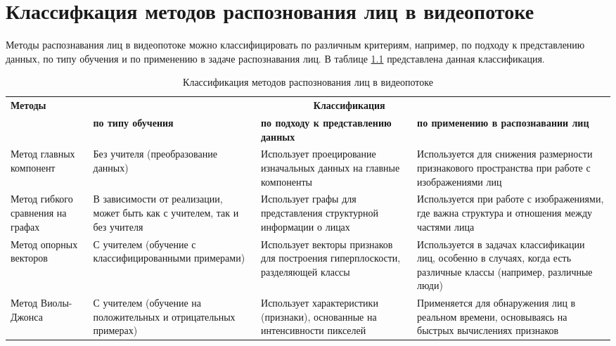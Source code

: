\chapter{Классифкация методов распознования лиц в видеопотоке}

Методы распознавания лиц в видеопотоке можно классифицировать по различным критериям, например, по подходу к представлению данных, по типу обучения и по применению в задаче распознавания лиц. В таблице \ref{tab:table} представлена данная классификация.

\begin{table}[h]
    \centering
    \small
    \caption{\label{tab:table} Классификация методов распознования лиц в видеопотоке}
    \begin{tabular}{|p{2cm}|p{3cm}|p{5cm}|p{5cm}|}
        \hline
        \multicolumn{1}{|l|}{\textbf{Методы}} & \multicolumn{3}{c|}{\textbf{Классификация}} \\
        \cline{2-4}
        & \textbf{по типу обучения} & \textbf{по подходу к представлению данных} & \textbf{по применению в распознавании лиц} \\
        \hline
        Метод главных компонент & Без учителя (преобразование данных) & Использует проецирование изначальных данных на главные компоненты & Используется для снижения размерности признакового пространства при работе с изображениями лиц \\
        \hline
        Метод гибкого сравнения на графах & В зависимости от реализации, может быть как с учителем, так и без учителя & Использует графы для представления структурной информации о лицах & Используется при работе с изображениями, где важна структура и отношения между частями лица \\
        \hline
        Метод опорных векторов & С учителем (обучение с классифицированными примерами) & Использует векторы признаков для построения гиперплоскости, разделяющей классы & Используется в задачах классификации лиц, особенно в случаях, когда есть различные классы (например, различные люди) \\
        \hline
        Метод Виолы-Джонса & С учителем (обучение на положительных и отрицательных примерах) & Использует характеристики (признаки), основанные на интенсивности пикселей & Применяется для обнаружения лиц в реальном времени, основываясь на быстрых вычислениях признаков \\
        \hline
    \end{tabular}
\end{table}

